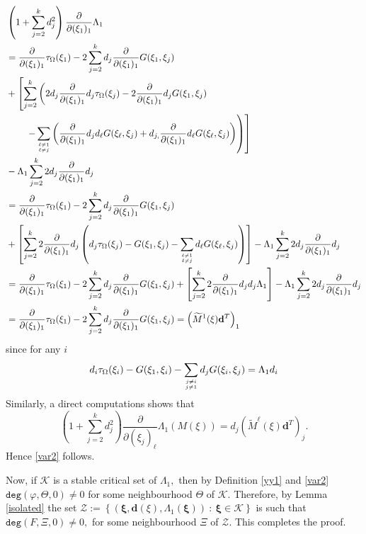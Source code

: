 \documentclass[11pt,a4paper]{amsart}
\theoremstyle{definition}
\renewcommand{\(}{\left(}
\renewcommand{\)}{\right)}
\begin{document}
$$\begin{aligned} &\left(1+\sum_{j=2}^k d_{j}^2\right)\frac{\partial}{\partial (\xi_1)_1}\Lambda_1\\
&=\frac{\partial}{\partial (\xi_1)_1} \tau_\Omega(\xi_1) -2\sum_{j=2}^k d_{j}\frac{\partial}{\partial (\xi_1)_1} G(\xi_1, \xi_j)\\
& +\left[\sum_{j=2}^k \left(2d_{j}\frac{\partial}{\partial (\xi_1)_1} d_{j} \tau_\Omega(\xi_j)-2\frac{\partial}{\partial (\xi_1)_1} d_{j} G(\xi_1, \xi_j)\right.\right.\\
&\left.\left.\qquad-\sum_{\ell\neq 1\atop \ell\neq j}\left(\frac{\partial}{\partial (\xi_1)_1} d_{j} d_{\ell} G(\xi_\ell, \xi_j)+d_{j,}\frac{\partial}{\partial (\xi_1)_1} d_{\ell} G(\xi_\ell, \xi_j)\right)\right)\right]\\
&-\Lambda_1\sum_{j=2}^k2d_{j} \frac{\partial}{\partial (\xi_1)_1} d_{j}\\
&=\frac{\partial}{\partial (\xi_1)_1} \tau_\Omega(\xi_1) -2\sum_{j=2}^k d_{j}\frac{\partial}{\partial (\xi_1)_1} G(\xi_1, \xi_j)\\
&+\left[\sum_{j=2}^k 2\frac{\partial}{\partial (\xi_1)_1} d_{j} \left(d_{j}\tau_\Omega(\xi_j)- G(\xi_1, \xi_j)-\sum_{\ell\neq 1\atop \ell\neq j} d_{\ell} G(\xi_\ell, \xi_j)\right)\right]-\Lambda_1\sum_{j=2}^k2d_{j} \frac{\partial}{\partial (\xi_1)_1} d_{j}\\
&=\frac{\partial}{\partial (\xi_1)_1} \tau_\Omega(\xi_1) -2\sum_{j=2}^k d_{j}\frac{\partial}{\partial (\xi_1)_1} G(\xi_1, \xi_j)+\left[\sum_{j=2}^k 2\frac{\partial}{\partial (\xi_1)_1} d_{j} d_{j} \Lambda_1\right]-\Lambda_1\sum_{j=2}^k2d_{j} \frac{\partial}{\partial (\xi_1)_1} d_{j}\\
&=\frac{\partial}{\partial (\xi_1)_1} \tau_\Omega(\xi_1) -2\sum_{j=2}^k d_{j}\frac{\partial}{\partial (\xi_1)_1} G(\xi_1, \xi_j)=\left(\widetilde M^1(\xi)\mathbf d^T\right)_{1}
\end{aligned}$$
since for any $i$ $$d_{i}\tau_\Omega(\xi_i) -G(\xi_1, \xi_i)-\sum_{j\neq i\atop j\neq 1} d_{j} G(\xi_i, \xi_j)=\Lambda_1 d_{i}$$ 
Similarly, a direct computations  shows that 
$$\left(1+\sum_{j=2}^k d_{j}^2\right)\frac{\partial}{\partial (\xi_j)_\ell}\Lambda_1(M(\xi))=d_j\left(\widetilde M^\ell(\xi)\mathbf d^T\right)_j.$$
Hence \eqref{var2} follows.


Now, if 
  $\mathscr K  $ is a stable critical set of $\Lambda_1,$ then by Definition \ref{yy1} and \eqref{var2} $\mathtt {deg}(\varphi, \Theta,0)\not=0$ for some neighbourhood $\Theta$ of $\mathscr K.$ Therefore, by 
 Lemma \ref{isolated} the set  $\mathscr Z:=\left\{(\boldsymbol\xi, \mathbf d(\xi), \Lambda_1(\boldsymbol\xi))\ :\ \boldsymbol\xi\in \mathscr K\right\}$ is such that 
$\mathtt {deg}(F, \Xi, 0)\not=0,$  for some neighbourhood $\Xi$ of $\mathscr Z.$ This completes the proof.
\end{document}
